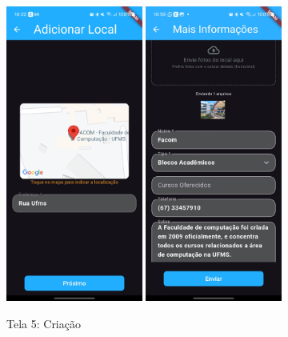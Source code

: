     \begin{figure}[h]
        \centering
        \includegraphics[width=0.4\textwidth]{imagens/criacao.jpg}
        \hspace{10mm}
        \includegraphics[width=0.4\textwidth]{imagens/criacao2.jpg}
        \caption{\scriptsize Tela 5: Criação}
        \label{fig:tela5}
    \end{figure}

    \FloatBarrier

